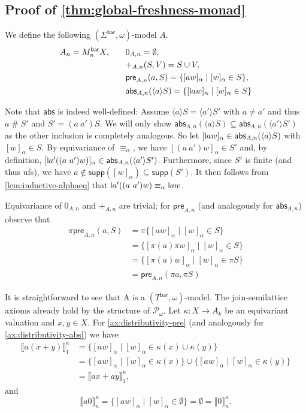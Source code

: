 \documentclass[11pt,a4paper]{amsart}
\newcommand{\Br}{\mathsf{bar}}
\newcommand{\pre}{\mathsf{pre}}
\newcommand{\abs}{\mathsf{abs}}
\newcommand{\alphaeq}{\equiv_\alpha}
\newcommand{\pow}{\mathcal{P}}
\newcommand{\fresh}{\mathbin{\#}}
\newcommand{\supp}{\mathsf{supp}}
\newcommand{\bind}[1]{\langle #1\rangle}
\theoremstyle{plain}
\newcommand{\midmid}{\hspace{0.2ex}{\rule[-0.1ex]{0.6pt}{1.65ex}}\hspace{0.2ex}}
\newcommand{\newletter}[1]{{\midmid}#1}
\numberwithin{equation}{section}
\newcommand{\sem}[1]{\llbracket #1 \rrbracket}
\newcommand{\+}[1]{\mathcal{#1}\xspace}
\theoremstyle{definition}
\begin{document}
\subsection*{Proof of \cref{thm:global-freshness-monad}}

We define the following $(\Sigma^\Br, \omega)$-model $A$.
\begin{align*}
A_n = M^\Br_n X, \qquad & 0_{A,n} = \emptyset, \\
& {+}_{A,n}(S, V) = S \cup V, \\
& \pre_{A,n}(a,S)=\{[aw]_\alpha\mid [w]_\alpha\in S\}, \\
& \abs_{A,n}(\bind{a}S)=\{[\newletter aw]_\alpha\mid[w]_\alpha\in S\}
\end{align*}

Note that \(\abs\) is indeed well-defined:
Assume \(\bind{a}S = \bind{a'}S'\) with \(a \neq a'\) and thus \(a \fresh S'\) and \(S' = (a\ a')S\).
We will only show \(\abs_{A, n}(\bind{a}S) \subseteq \abs_{A, n}(\bind{a'}S')\) as the other inclusion is completely analogous.
So let \([\newletter{a}w]_\alpha \in \abs_{A, n}(\bind{a}S)\) with \([w]_\alpha \in S\).
By equivariance of \(\alphaeq\), we have \([(a\ a')w]_\alpha \in S'\) and, by definition, \([\newletter{a'}((a\ a')w)]_\alpha \in \abs_{A, n}(\bind{a'}S')\).
Furthermore, since \(S'\) is finite (and thus ufs), we have \(a \notin \supp([w]_\alpha) \subseteq \supp(S')\).
It then follows from \cref{lem:inductive-alphaeq} that \(\newletter{a'}((a\ a')w) \alphaeq \newletter{a}w\).

Equivariance of $0_{A,n}$ and $+_{A,n}$ are trivial; for $\pre_{A,n}$ (and analogously for $\abs_{A,n}$) observe that
\begin{align*}
    \pi \pre_{A,n}(a,S) &= \pi \{[aw]_\alpha\mid [w]_\alpha\in S\} \\
    &= \{[\pi(a)\pi w]_\alpha\mid [w]_\alpha\in S\} \\
    &= \{[\pi(a) w]_\alpha\mid [w]_\alpha\in \pi S\} \\
    &= \pre_{A,n}(\pi a, \pi S)
\end{align*}

It is straightforward to see that A is a $(T^\Br,\omega)$-model. The join-semilattice axioms already hold by the structure of \(\pow_\omega\). Let \(\kappa: X \to A_k\) be an equivariant valuation and $x,y \in X$. For \eqref{ax:distributivity-pre} (and analogously for \eqref{ax:distributivity-abs}) we have
    \begin{align*}
      \sem{a(x + y)}^\kappa_1
      &= \{ [aw]_\alpha \mid [w]_\alpha \in \kappa(x) \cup \kappa(y) \} \\
      &= \{ [aw]_\alpha \mid [w]_\alpha \in \kappa(x) \} \cup \{ [aw]_\alpha \mid [w]_\alpha \in \kappa(y) \} \\
      &= \sem{ax + ay}^\kappa_1,
    \end{align*}
    and
    \begin{equation*}
      \sem{a 0}^\kappa_n = \{ [aw]_\alpha \mid [w]_\alpha \in \emptyset \} = \emptyset = \sem{0}^\kappa_n.
    \end{equation*}
\end{document}
